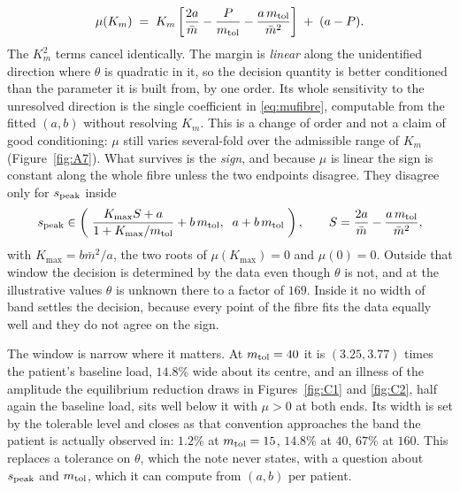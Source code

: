 \begin{enumerate}[leftmargin=*, itemsep=2pt]
\begin{equation}
      \mu(K_m) \;=\; K_m\left[\frac{2a}{\bar m} - \frac{P}{m_{\mathrm{tol}}}
      - \frac{a\,m_{\mathrm{tol}}}{\bar m^{2}}\right] \;+\; (a - P).
      \label{eq:mufibre}
      \end{equation}
      The $K_m^2$ terms cancel identically. The margin is \emph{linear} along the
      unidentified direction where $\theta$ is quadratic in it, so the decision quantity is
      better conditioned than the parameter it is built from, by one order. Its whole
      sensitivity to the unresolved direction is the single coefficient in
      \eqref{eq:mufibre}, computable from the fitted $(a,b)$ without resolving $K_m$.
      This is a change of order and not a claim of good conditioning: $\mu$ still varies
      several-fold over the admissible range of $K_m$ (Figure~\ref{fig:A7}). What survives
      is the \emph{sign}, and because $\mu$ is linear the sign is constant along the whole
      fibre unless the two endpoints disagree. They disagree only for $s_{\mathrm{peak}}$ inside
      \begin{equation}
      s_{\mathrm{peak}} \in \left(\;\frac{K_{\max} S + a}{1 + K_{\max}/m_{\mathrm{tol}}} + b\,m_{\mathrm{tol}},
      \;\; a + b\,m_{\mathrm{tol}} \;\right),
      \qquad S = \frac{2a}{\bar m} - \frac{a\,m_{\mathrm{tol}}}{\bar m^{2}},
      \label{eq:window}
      \end{equation}
      with $K_{\max} = b\bar m^{2}/a$, the two roots of $\mu(K_{\max}) = 0$ and
      $\mu(0) = 0$. Outside that window the decision is determined by the data even
      though $\theta$ is not, and at the illustrative values $\theta$ is unknown there to a
      factor of $169$. Inside it no width of band settles the decision, because every point
      of the fibre fits the data equally well and they do not agree on the sign.

      The window is narrow where it matters. At $m_{\mathrm{tol}} = 40$ it is
      $(3.25, 3.77)$ times the patient's baseline load, $14.8\%$ wide about its centre,
      and an illness of the amplitude the equilibrium reduction draws in Figures~\ref{fig:C1} and
      \ref{fig:C2}, half again the baseline load, sits well below it with $\mu > 0$ at
      both ends. Its width is set by the tolerable level and closes as that convention
      approaches the band the patient is actually observed in: $1.2\%$ at $m_{\mathrm{tol}} = 15$,
      $14.8\%$ at $40$, $67\%$ at $160$. This replaces a tolerance on $\theta$, which the
      note never states, with a question about $s_{\mathrm{peak}}$ and $m_{\mathrm{tol}}$, which it can compute
      from $(a, b)$ per patient.


\end{enumerate}
